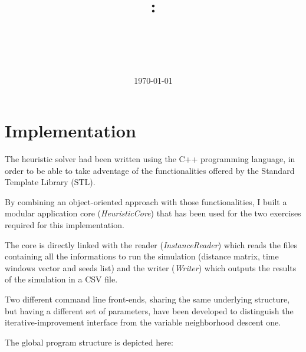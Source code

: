 \documentclass{article}
\title{
\vspace{2in}
\textmd{\textbf{\hmwkClass:\\ \hmwkTitle}}\\
\vspace{0.1in}\large{\textit{\hmwkClassInstructor\ }}
\vspace{3in}
}
\author{\textbf{\hmwkAuthorName}}
\date{\today} %
\newcommand{\component}[2]{node (p#1) [component]
  {{\scriptsize\textit{#2}}}}
\newcommand{\backgroundSquare}[5]{%
  \begin{pgfonlayer}{background}
    \path (#1.west |- #2.north)+(-0.5,0.5) node (a1) {};
    \path (#3.east |- #4.south)+(+0.5,-0.25) node (a2) {};
    \path[fill=blue!20,rounded corners, draw=black!50, dashed]
      (a1) rectangle (a2);
    \path (a1.east |- a1.south)+(0.8,-0.3) node (u1)[texto]
      {\scriptsize\textit{#5 Tier}};
  \end{pgfonlayer}}
\begin{document}
\maketitle



\newpage
\tableofcontents
\newpage

\section{Implementation}
The heuristic solver had been written using the C++ programming language, in order to be able to take adventage of the functionalities offered by the Standard Template Library (STL).

By combining an object-oriented approach with those functionalities, I built a modular application core (\emph{HeuristicCore}) that has been used for the two exercises required for this implementation.

The core is directly linked with the reader (\emph{InstanceReader}) which reads the files containing all the informations to run the simulation (distance matrix, time windows vector and seeds list) and the writer (\emph{Writer}) which outputs the results of the simulation in a CSV file.

Two different command line front-ends, sharing the same underlying structure, but having a different set of parameters, have been developed to distinguish the iterative-improvement interface from the variable neighborhood descent one. 

The global program structure is depicted here:

\begin{center}
\end{center}
\end{document}
